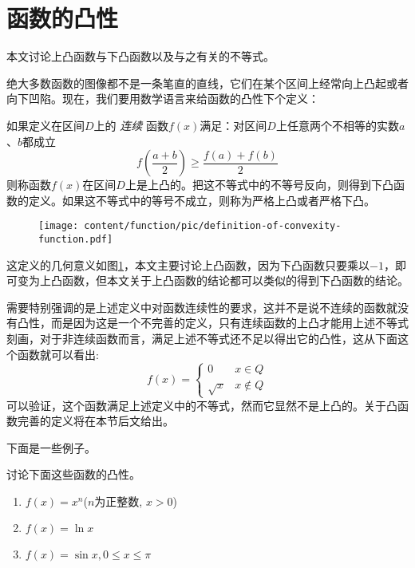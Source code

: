 
\section{函数的凸性}
\label{sec:the-convexity-of-function}

本文讨论上凸函数与下凸函数以及与之有关的不等式。

绝大多数函数的图像都不是一条笔直的直线，它们在某个区间上经常向上凸起或者向下凹陷。现在，我们要用数学语言来给函数的凸性下个定义：
\begin{definition}
 如果定义在区间$D$上的 \emph{连续} 函数$f(x)$满足：对区间$D$上任意两个不相等的实数$a$、$b$都成立
 \begin{equation}
   \label{eq:the-definition-of-convexity-function}
f(\frac{a+b}{2}) \geqslant \frac{f(a)+f(b)}{2}
 \end{equation}
则称函数$f(x)$在区间$D$上是上凸的。把这不等式中的不等号反向，则得到下凸函数的定义。如果这不等式中的等号不成立，则称为严格上凸或者严格下凸。
\end{definition}

\begin{figure}[htbp]
  \centering
\texttt{[image: content/function/pic/definition-of-convexity-function.pdf]}
\caption{}
\label{fig:definition-of-convexity-function}
\end{figure}

这定义的几何意义如图\ref{fig:definition-of-convexity-function}，本文主要讨论上凸函数，因为下凸函数只要乘以$-1$，即可变为上凸函数，但本文关于上凸函数的结论都可以类似的得到下凸函数的结论。

需要特别强调的是上述定义中对函数连续性的要求，这并不是说不连续的函数就没有凸性，而是因为这是一个不完善的定义，只有连续函数的上凸才能用上述不等式刻画，对于非连续函数而言，满足上述不等式还不足以得出它的凸性，这从下面这个函数就可以看出:
\begin{equation*}
  f(x) =
  \left\{
      \begin{array}{ll}
        0 & x \in Q \\
        \sqrt{x} &  x \notin Q
      \end{array}
  \right.
\end{equation*}
可以验证，这个函数满足上述定义中的不等式，然而它显然不是上凸的。关于凸函数完善的定义将在本节后文给出。

下面是一些例子。

\begin{example}
  讨论下面这些函数的凸性。
  \begin{enumerate}
  \item $f(x)=x^n$($n$为正整数, $x>0$)
  \item $f(x)=\ln{x}$
  \item $f(x)=\sin{x}, 0 \leqslant x \leqslant \pi$
  \end{enumerate}
\end{example}

